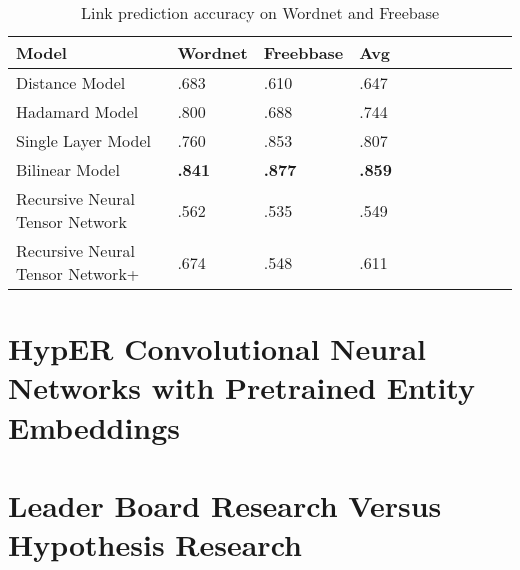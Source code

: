 \begin{table}[H]
	\caption{Link prediction accuracy on Wordnet and Freebase}
	\centering
	\begin{tabular}{lllllllllll}
  		\textbf{Model} & \textbf{Wordnet} & \textbf{Freebbase} & \textbf{Avg} \\
  		\hline
  		Distance Model & .683 & .610 & .647 \\
  		Hadamard Model & .800 & .688 & .744 \\
  		Single Layer Model & .760 & .853 & .807 \\
  		Bilinear Model & \textbf{.841} & \textbf{.877} & \textbf{.859} \\
  		Recursive Neural Tensor Network & .562 & .535 & .549 \\
  		\hline
  		Recursive Neural Tensor Network+ & .674 & .548 & .611 \\
	\end{tabular}
\end{table}

\section{HypER Convolutional Neural Networks with Pretrained Entity Embeddings}

\section{Leader Board Research Versus Hypothesis Research}

